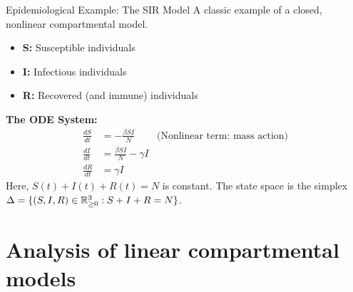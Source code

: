 \documentclass[aspectratio=169]{beamer}\usepackage[]{graphicx}\usepackage[]{xcolor}
\begin{document}
\begin{frame}{Epidemiological Example: The SIR Model}
    A classic example of a closed, nonlinear compartmental model.
    \begin{itemize}
        \item \textbf{S:} Susceptible individuals
        \item \textbf{I:} Infectious individuals
        \item \textbf{R:} Recovered (and immune) individuals
    \end{itemize}

    \begin{center}
    \end{center}

    \textbf{The ODE System:}
    \begin{align*}
        \frac{dS}{dt} &= -\frac{\beta S I}{N} \quad &\text{(Nonlinear term: mass action)} \\
        \frac{dI}{dt} &= \frac{\beta S I}{N} - \gamma I \\
        \frac{dR}{dt} &= \gamma I
    \end{align*}
    Here, $S(t)+I(t)+R(t) = N$ is constant. The state space is the simplex $\Delta = \{(S,I,R) \in \mathbb{R}_{\ge 0}^3 : S+I+R=N\}$.
\end{frame}

\section{Analysis of linear compartmental models}
\end{document}

